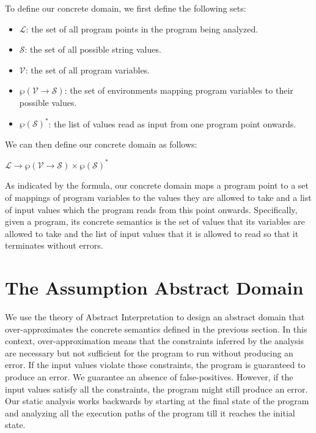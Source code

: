 \documentclass[10pt]{report}
\begin{document}
To define our concrete domain, we first define the following sets:
\begin{itemize}
	\item $\mathcal{L}$: the set of all program points in the program being analyzed. 
	\item $\mathcal{S}$: the set of all possible string values. 
	\item $\mathcal{V}$: the set of all program variables.
	\item$\wp(\mathcal{V} \rightarrow \mathcal{S})$: the set of environments mapping program variables to their possible values. 
	\item $\wp(\mathcal{S})^{*}$: the list of values read as input from one program point onwards.  
\end{itemize}

We can then define our concrete domain as follows: 
\begin{center}
$\mathcal{L} \rightarrow \wp(\mathcal{V} \rightarrow \mathcal{S}) \times \wp(\mathcal{S})^{*}$
\end{center}

As indicated by the formula, our  concrete domain maps a program point to a set of mappings of program variables to the values they are allowed to take and a list of input values which the program reads from this point onwards. Specifically, given a program, its concrete semantics is the set of values that its variables are allowed to take and the list of input values that it is allowed to read so that it terminates without errors.   

\section{The Assumption Abstract Domain} \label{assumption-domain}
We use the theory of Abstract Interpretation \cite{cousot} to design an abstract domain that over-approximates the concrete semantics defined in the previous section. In this context, over-approximation means that the constraints inferred by the analysis are necessary but not sufficient for the program to run without producing an error. If the input values violate those constraints, the program is guaranteed to produce an error. We guarantee an absence of false-positives. However, if the input values satisfy all the constraints, the program might still produce an error. Our static analysis works backwards by starting at the final state of the program and analyzing all the execution paths of the program till it reaches the initial state.  
\end{document}
